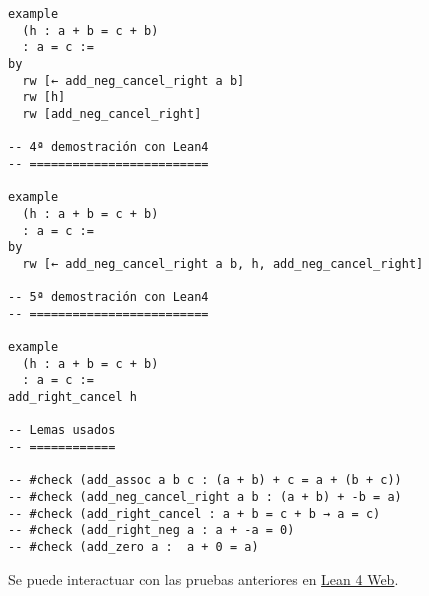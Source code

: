 \begin{verbatim}
example
  (h : a + b = c + b)
  : a = c :=
by
  rw [← add_neg_cancel_right a b]
  rw [h]
  rw [add_neg_cancel_right]

-- 4ª demostración con Lean4
-- =========================

example
  (h : a + b = c + b)
  : a = c :=
by
  rw [← add_neg_cancel_right a b, h, add_neg_cancel_right]

-- 5ª demostración con Lean4
-- =========================

example
  (h : a + b = c + b)
  : a = c :=
add_right_cancel h

-- Lemas usados
-- ============

-- #check (add_assoc a b c : (a + b) + c = a + (b + c))
-- #check (add_neg_cancel_right a b : (a + b) + -b = a)
-- #check (add_right_cancel : a + b = c + b → a = c)
-- #check (add_right_neg a : a + -a = 0)
-- #check (add_zero a :  a + 0 = a)
\end{verbatim}
Se puede interactuar con las pruebas anteriores en \href{https://lean.math.hhu.de/\#url=https://raw.githubusercontent.com/jaalonso/Calculemus2/main/src/Cancelativa\_derecha.lean}{Lean 4 Web}.

